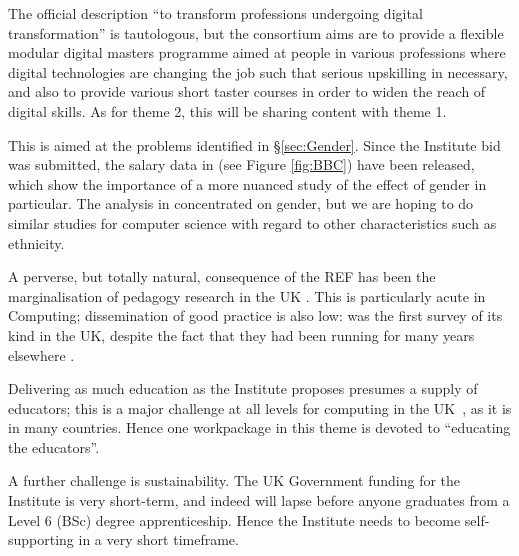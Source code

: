 \documentclass[sigconf]{acmart}
\begin{document}
 The official description ``to
transform professions undergoing digital transformation''
\cite{DfE2018a} is tautologous, but the consortium aims are to provide
a flexible modular digital masters programme aimed at people in
various professions where digital technologies are changing the job
such that serious upskilling in necessary, and also to provide various
short taster courses in order to widen the reach of digital skills. As
for theme 2, this will be sharing content with theme 1.\newline

 This is aimed at the problems
identified in \S\ref{sec:Gender}. Since the Institute bid was
submitted, the salary data in \cite{DfE2018d} (see Figure
\ref{fig:BBC}) have been released, which show the importance of a more
nuanced study of the effect of gender in particular. The analysis in
\cite{DfE2018d} concentrated on gender, but we are hoping to do
similar studies for computer science with regard to other
characteristics such as ethnicity.\newline

 A perverse, but totally
natural, consequence of the REF has been the marginalisation of
pedagogy research in the UK \cite{Cottonetal2018a}. This is
particularly acute in Computing; dissemination of good practice is
also low: \cite{murphy-et-al:programming2017} was the first survey of
its kind in the UK, despite the fact that they had been running for
many years elsewhere \cite{simon-et-al:sigcse2018}.\newline

Delivering as much education as the Institute proposes presumes a
supply of educators; this is a major challenge at all levels for
computing in the UK~\cite{brown-et-al:toce2014,moller+crick:jce2018},
as it is in many countries. Hence one workpackage
in this theme is devoted to ``educating the educators''.

A further challenge is sustainability. The UK Government funding for
the Institute is very short-term, and indeed will lapse before anyone
graduates from a Level 6 (BSc) degree apprenticeship. Hence the
Institute needs to become self-supporting in a very short timeframe.
\end{document}
